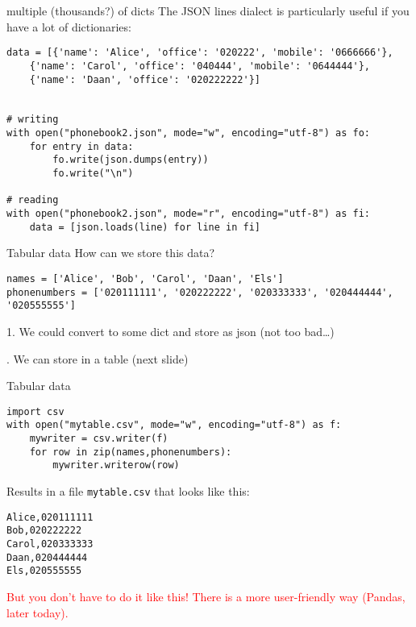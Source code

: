\begin{frame}[fragile]{multiple (thousands?) of dicts}
The JSON lines dialect is particularly useful if you have a lot of dictionaries:

\begin{verbatim}
data = [{'name': 'Alice', 'office': '020222', 'mobile': '0666666'},
	{'name': 'Carol', 'office': '040444', 'mobile': '0644444'},
	{'name': 'Daan', 'office': '020222222'}]


# writing
with open("phonebook2.json", mode="w", encoding="utf-8") as fo:
    for entry in data:
        fo.write(json.dumps(entry))
        fo.write("\n")
	
# reading
with open("phonebook2.json", mode="r", encoding="utf-8") as fi:
    data = [json.loads(line) for line in fi]
\end{verbatim}

\end{frame}







\begin{frame}[fragile]{Tabular data}
How can we store this data?
\begin{verbatim}
names = ['Alice', 'Bob', 'Carol', 'Daan', 'Els']
phonenumbers = ['020111111', '020222222', '020333333', '020444444', '020555555']
\end{verbatim}
\pause

1. We could convert to some dict and store as json (not too bad\ldots)

. We can store in a table
(next slide)
\end{frame}

\begin{frame}[fragile]{Tabular data}
\begin{verbatim}
import csv
with open("mytable.csv", mode="w", encoding="utf-8") as f:
    mywriter = csv.writer(f)
    for row in zip(names,phonenumbers):
        mywriter.writerow(row)
\end{verbatim}
	
Results in a file \texttt{mytable.csv} that looks like this:
\begin{verbatim}
Alice,020111111
Bob,020222222
Carol,020333333
Daan,020444444
Els,020555555
\end{verbatim}
\pause
\textcolor{red}{But you don't have to do it like this! There is a more user-friendly way (Pandas, later today).}
\end{frame}


